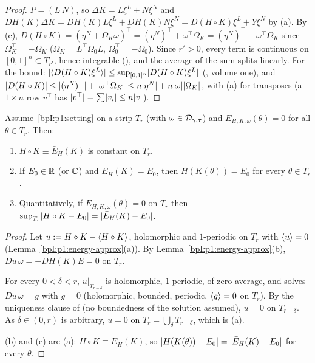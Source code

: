 \begin{proof}
\label{stepI:p1:ea-defect}
$P=(L\ N)$, so $\Delta K=L\xi^L+N\xi^N$ and $DH(K)\Delta K=DH(K)L\xi^L+DH(K)N\xi^N=D(H\circ K)\xi^L+Y\xi^N$ by (a).
By (c), $D(H\circ K)=(\eta^N+\Omega_K\omega)^\top=(\eta^N)^\top+\omega^\top\Omega_K^\top=(\eta^N)^\top-\omega^\top\Omega_K$ since
$\Omega_K^\top=-\Omega_K$ ($\Omega_K=L^\top\Omega_0L$, $\Omega_0^\top=-\Omega_0$). Since $r'>0$, every term is continuous on $[0,1]^n\subset T_{r'}$, hence integrable (), and the average of the sum splits linearly.
For the bound: $\lvert \langle D(H\circ K)\xi^L\rangle\rvert\le\sup_{[0,1]^n}\lvert D(H\circ K)\xi^L\rvert$ (, volume one), and
$\lvert D(H\circ K)\rvert\le\lvert (\eta^N)^\top\rvert+\lvert \omega^\top\Omega_K\rvert\le n\lvert \eta^N\rvert+n\lvert \omega\rvert\lvert \Omega_K\rvert$, with
(a) for transposes (a $1\times n$ row $v^\top$ has $\lvert v^\top\rvert=\sum\lvert v_i\rvert\le n\lvert v\rvert$).
\end{proof}

\begin{lemma}\label{bpI:p1:energy-conservation}
Assume~\ref{bpI:p1:setting} on a strip $T_r$ (with $\omega\in\mathcal{D}_{\gamma,\tau}$) and $E_{H,K,\omega}(\theta)=0$ for all $\theta\in T_r$.
Then:
\begin{enumerate}[label=(\alph*)]
\item $H\circ K\equiv\bar E_H(K)$ is constant on $T_r$.
\item If $E_0\in\mathbb{R}$ (or $\mathbb{C}$) and $\bar E_H(K)=E_0$, then $H(K(\theta))=E_0$ for every $\theta\in T_r$.
\item Quantitatively, if $E_{H,K,\omega}(\theta)=0$ on $T_r$ then $\sup_{T_r}\lvert H\circ K-E_0\rvert=\lvert \bar E_H(K)-E_0\rvert$.
\end{enumerate}
\end{lemma}

\begin{proof}
\label{stepI:p1:ec-derivative}
Let $u:=H\circ K-\langle H\circ K\rangle$, holomorphic and $1$-periodic on $T_r$ with $\langle u\rangle=0$ (Lemma~\ref{bpI:p1:energy-approx}(a)).
By Lemma~\ref{bpI:p1:energy-approx}(b), $Du\,\omega=-DH(K)E=0$ on $T_r$.

\label{stepI:p1:ec-unique}
For every $0<\delta<r$, $u|_{T_{r-\delta}}$ is holomorphic, $1$-periodic, of zero average, and solves $Du\,\omega=g$ with
$g=0$ (holomorphic, bounded, periodic, $\langle g\rangle=0$ on $T_r$). By the uniqueness clause of 
(no boundedness of the solution assumed), $u=0$ on $T_{r-\delta}$. As $\delta\in(0,r)$ is arbitrary, $u=0$ on $T_r=\bigcup_\delta T_{r-\delta}$,
which is (a).

\label{stepI:p1:ec-pointwise}
(b) and (c) are (a): $H\circ K\equiv\bar E_H(K)$, so $\lvert H(K(\theta))-E_0\rvert=\lvert \bar E_H(K)-E_0\rvert$ for every $\theta$.
\end{proof}

